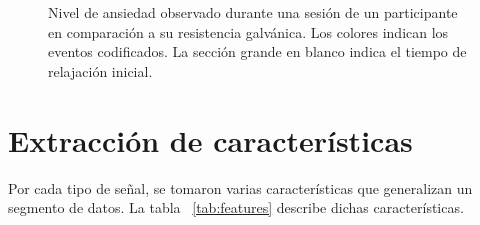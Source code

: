 \begin{figure}[h]
        \centering
        \caption{Nivel de ansiedad observado durante una sesi\'on de un participante en comparaci\'on a su resistencia galv\'anica. Los colores indican los eventos codificados. La secci\'on grande en blanco indica el tiempo de relajaci\'on inicial.}\label{fig:session_anxietylevel}
\end{figure}

\section{Extracci\'on de caracter\'isticas}
Por cada tipo de se\~nal, se tomaron varias caracter\'isticas que generalizan un segmento de datos. La tabla ~\ref{tab:features} describe dichas caracter\'isticas.


